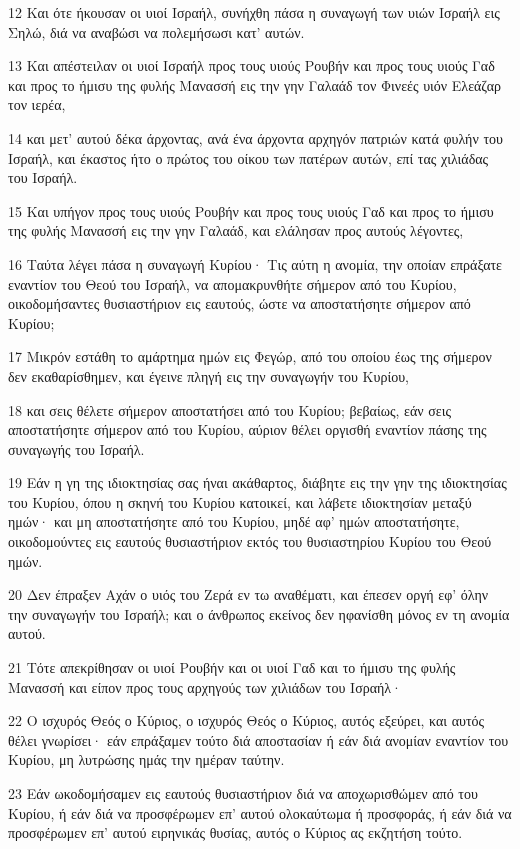 \par 12 Και ότε ήκουσαν οι υιοί Ισραήλ, συνήχθη πάσα η συναγωγή των υιών Ισραήλ εις Σηλώ, διά να αναβώσι να πολεμήσωσι κατ' αυτών.
\par 13 Και απέστειλαν οι υιοί Ισραήλ προς τους υιούς Ρουβήν και προς τους υιούς Γαδ και προς το ήμισυ της φυλής Μανασσή εις την γην Γαλαάδ τον Φινεές υιόν Ελεάζαρ τον ιερέα,
\par 14 και μετ' αυτού δέκα άρχοντας, ανά ένα άρχοντα αρχηγόν πατριών κατά φυλήν του Ισραήλ, και έκαστος ήτο ο πρώτος του οίκου των πατέρων αυτών, επί τας χιλιάδας του Ισραήλ.
\par 15 Και υπήγον προς τους υιούς Ρουβήν και προς τους υιούς Γαδ και προς το ήμισυ της φυλής Μανασσή εις την γην Γαλαάδ, και ελάλησαν προς αυτούς λέγοντες,
\par 16 Ταύτα λέγει πάσα η συναγωγή Κυρίου· Τις αύτη η ανομία, την οποίαν επράξατε εναντίον του Θεού του Ισραήλ, να απομακρυνθήτε σήμερον από του Κυρίου, οικοδομήσαντες θυσιαστήριον εις εαυτούς, ώστε να αποστατήσητε σήμερον από Κυρίου;
\par 17 Μικρόν εστάθη το αμάρτημα ημών εις Φεγώρ, από του οποίου έως της σήμερον δεν εκαθαρίσθημεν, και έγεινε πληγή εις την συναγωγήν του Κυρίου,
\par 18 και σεις θέλετε σήμερον αποστατήσει από του Κυρίου; βεβαίως, εάν σεις αποστατήσητε σήμερον από του Κυρίου, αύριον θέλει οργισθή εναντίον πάσης της συναγωγής του Ισραήλ.
\par 19 Εάν η γη της ιδιοκτησίας σας ήναι ακάθαρτος, διάβητε εις την γην της ιδιοκτησίας του Κυρίου, όπου η σκηνή του Κυρίου κατοικεί, και λάβετε ιδιοκτησίαν μεταξύ ημών· και μη αποστατήσητε από του Κυρίου, μηδέ αφ' ημών αποστατήσητε, οικοδομούντες εις εαυτούς θυσιαστήριον εκτός του θυσιαστηρίου Κυρίου του Θεού ημών.
\par 20 Δεν έπραξεν Αχάν ο υιός του Ζερά εν τω αναθέματι, και έπεσεν οργή εφ' όλην την συναγωγήν του Ισραήλ; και ο άνθρωπος εκείνος δεν ηφανίσθη μόνος εν τη ανομία αυτού.
\par 21 Τότε απεκρίθησαν οι υιοί Ρουβήν και οι υιοί Γαδ και το ήμισυ της φυλής Μανασσή και είπον προς τους αρχηγούς των χιλιάδων του Ισραήλ·
\par 22 Ο ισχυρός Θεός ο Κύριος, ο ισχυρός Θεός ο Κύριος, αυτός εξεύρει, και αυτός θέλει γνωρίσει· εάν επράξαμεν τούτο διά αποστασίαν ή εάν διά ανομίαν εναντίον του Κυρίου, μη λυτρώσης ημάς την ημέραν ταύτην.
\par 23 Εάν ωκοδομήσαμεν εις εαυτούς θυσιαστήριον διά να αποχωρισθώμεν από του Κυρίου, ή εάν διά να προσφέρωμεν επ' αυτού ολοκαύτωμα ή προσφοράς, ή εάν διά να προσφέρωμεν επ' αυτού ειρηνικάς θυσίας, αυτός ο Κύριος ας εκζητήση τούτο.

